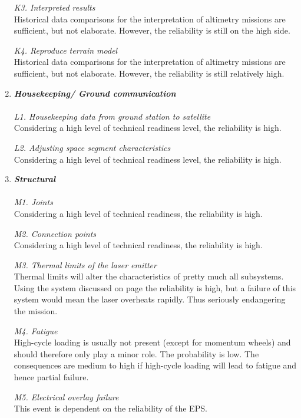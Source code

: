 \documentclass[11pt]{report}
\begin{document}
\begin{enumerate}[A]
\textit{K3. Interpreted results}\\ 
Historical data comparisons for the interpretation of altimetry missions are sufficient, but not elaborate. However, the reliability is still on the high side.

\textit{K4. Reproduce terrain model}\\
Historical data comparisons for the interpretation of altimetry missions are sufficient, but not elaborate. However, the reliability is still relatively high.
 
	\item\textbf{\textit{Housekeeping/ Ground communication}} \\\\
\textit{L1. Housekeeping data from ground station to satellite}\\ 
Considering a high level of technical readiness level, the reliability is high.

\textit{L2. Adjusting space segment characteristics}\\ 
Considering a high level of technical readiness level, the reliability is high.

	\item\textbf{\textit{Structural}} \\\\
\textit{M1. Joints}\\ 
Considering a high level of technical readiness, the reliability is high.

\textit{M2. Connection points}\\ 
Considering a high level of technical readiness, the reliability is high.

\textit{M3. Thermal limits of the laser emitter}\\ 
Thermal limits will alter the characteristics of pretty much all subsystems. Using the system discussed on page \pageref{opticalthermal} the reliability is high, but a failure of this system would mean the laser overheats rapidly. Thus seriously endangering the mission.

\textit{M4. Fatigue}\\ 
High-cycle loading is usually not present (except for momentum wheels) and should therefore only play a minor role. The probability is low. The consequences are medium to high if high-cycle loading will lead to fatigue and hence partial failure.

\textit{M5. Electrical overlay failure}\\ 
This event is dependent on the reliability of the EPS.


\end{enumerate}
\end{document}
